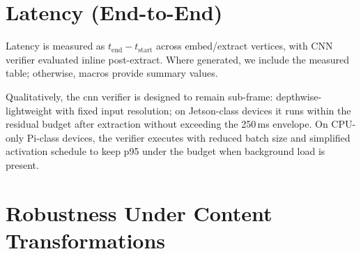 
\section{Latency (End-to-End)}
\label{sec:validation:latency}

Latency is measured as \(t_{\text{end}}-t_{\text{start}}\) across embed/extract vertices, with CNN verifier evaluated inline post-extract. Where generated, we include the measured table; otherwise, macros provide summary values.


Qualitatively, the \gls{cnn} verifier is designed to remain sub-frame: depthwise-lightweight with fixed input resolution; on Jetson-class devices it runs within the residual budget after extraction without exceeding the 250\,ms envelope. On CPU-only Pi-class devices, the verifier executes with reduced batch size and simplified activation schedule to keep p95 under the budget when background load is present.


\section{Robustness Under Content Transformations}
\label{sec:validation:robustness}


